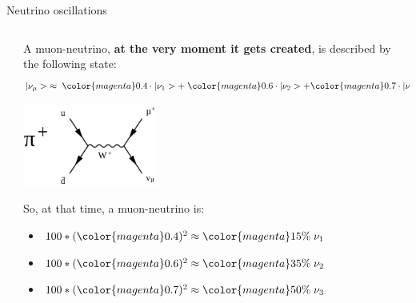 \begin{frame}{Neutrino oscillations}
\begin{columns}
\begin{column}{0.30\textwidth}
\begin{center}
   \end{center}
 \end{column}
 \begin{column}{0.70\textwidth}
   A muon-neutrino,
   {\bf at the very moment it gets created}, is described by the
   following state:
   \begin{equation}
     \nonumber
       |\nu_{\mu}> \; \approx \;
              {\color{magenta}0.4} \cdot |\nu_1> + \;
              {\color{magenta} 0.6} \cdot |\nu_2> +
              {\color{magenta} 0.7} \cdot |\nu_3>
   \end{equation}
   \begin{center}
     \includegraphics[width=0.35\textwidth]{./images/osc101/piplus_muon_decay}\\
   \end{center}
   So, at that time, a muon-neutrino is:
   \begin{itemize}
           \item $100 * ({\color{magenta}0.4})^2 \approx {\color{magenta}15\%} \; \nu_{1}$
           \item $100 * ({\color{magenta}0.6})^2 \approx {\color{magenta}35\%} \; \nu_{2}$
           \item $100 * ({\color{magenta}0.7})^2 \approx {\color{magenta}50\%} \; \nu_{3}$
   \end{itemize}
 \end{column}
\end{columns}

\end{frame}

%
%
%

